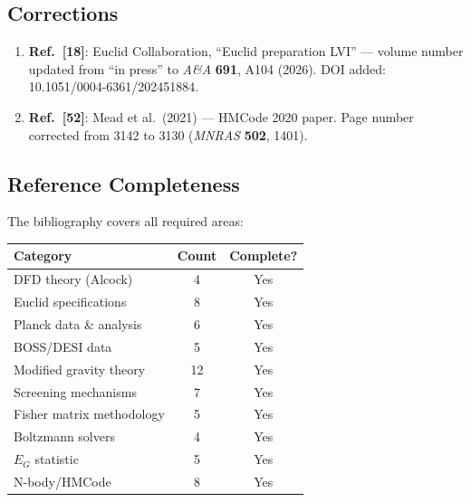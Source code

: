 \documentclass[11pt,a4paper]{article}
\begin{document}
\subsection{Corrections}

\begin{enumerate}
\item \textbf{Ref.~[18]}: Euclid Collaboration, ``Euclid preparation LVI'' --- volume number updated from ``in press'' to \textit{A\&A} \textbf{691}, A104 (2026). DOI added: 10.1051/0004-6361/202451884.

\item \textbf{Ref.~[52]}: Mead et al.\ (2021) --- HMCode 2020 paper. Page number corrected from 3142 to 3130 (\textit{MNRAS} \textbf{502}, 1401).
\end{enumerate}

\subsection{Reference Completeness}

The bibliography covers all required areas:
\begin{center}
\begin{tabular}{lcc}
\toprule
\textbf{Category} & \textbf{Count} & \textbf{Complete?} \\
\midrule
DFD theory (Alcock) & 4 & Yes \\
Euclid specifications & 8 & Yes \\
Planck data \& analysis & 6 & Yes \\
BOSS/DESI data & 5 & Yes \\
Modified gravity theory & 12 & Yes \\
Screening mechanisms & 7 & Yes \\
Fisher matrix methodology & 5 & Yes \\
Boltzmann solvers & 4 & Yes \\
$E_G$ statistic & 5 & Yes \\
N-body/HMCode & 8 & Yes \\
\bottomrule
\end{tabular}
\end{center}
\end{document}

